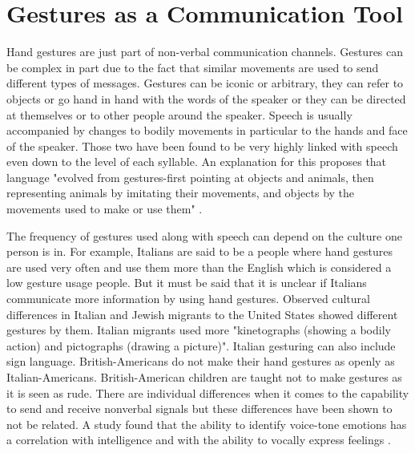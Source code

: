 \documentclass{article}
\begin{document}
\section*{Gestures as a Communication Tool}
Hand gestures are just part of non-verbal communication channels. Gestures can be complex in part due to the fact that similar movements are used to send different types of messages. Gestures can be iconic or arbitrary, they can refer to objects or go hand in hand with the words of the speaker or they can be directed at themselves or to other people around the speaker. Speech is usually accompanied by changes to bodily movements in particular to the hands and face of the speaker. Those two have been found to be very highly linked with speech even down to the level of each syllable. An explanation for this proposes that language "evolved from gestures-first pointing at objects and animals, then representing animals by imitating their movements, and objects by the movements used to make or use them" \cite{https://doi.org/10.1080/00207597508247319}.

The frequency of gestures used along with speech can depend on the culture one person is in. For example, Italians are said to be a people where hand gestures are used very often and use them more than the English which is considered a low gesture usage people. But it must be said that it is unclear if Italians communicate more information by using hand gestures. Observed cultural differences in Italian and Jewish migrants to the United States showed different gestures by them. Italian migrants used more "kinetographs (showing a bodily action) and pictographs (drawing a picture)". Italian gesturing can also include sign language. British-Americans do not make their hand gestures as openly as Italian-Americans. British-American children are taught not to make gestures as it is seen as rude. There are individual differences when it comes to the capability to send and receive nonverbal signals but these differences have been shown to not be related. A study found that the ability to identify voice-tone emotions has a correlation with intelligence and with the ability to vocally express feelings \cite{https://doi.org/10.1080/00207597508247319}.
\end{document}
